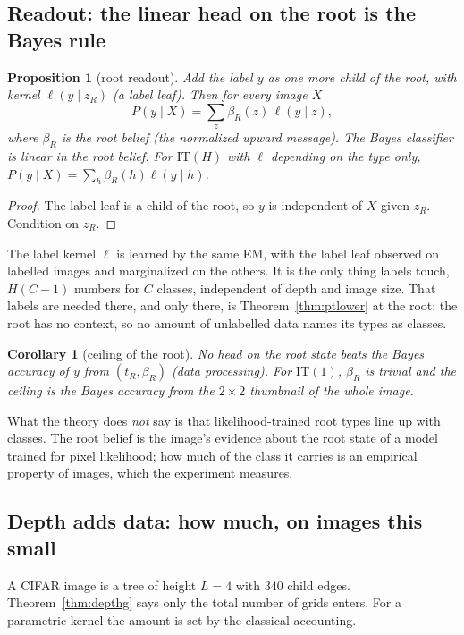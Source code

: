 \documentclass[11pt]{article}
\newtheorem{proposition}[theorem]{Proposition}
\newtheorem{corollary}[theorem]{Corollary}
\theoremstyle{definition}
\begin{document}
\subsection{Readout: the linear head on the root is the Bayes rule}\label{sec:cifar-readout}
\begin{proposition}[root readout]\label{prop:readout}
Add the label $y$ as one more child of the root, with kernel $\ell(y\mid z_R)$ (a \emph{label leaf}). Then for
every image $X$
\[
P(y\mid X)=\sum_{z}\beta_R(z)\,\ell(y\mid z),
\]
where $\beta_R$ is the root belief (the normalized upward message). The Bayes classifier is \emph{linear in the
root belief}. For $\mathrm{IT}(H)$ with $\ell$ depending on the type only, $P(y\mid X)=\sum_h\beta_R(h)\ell(y\mid h)$.
\end{proposition}
\begin{proof}
The label leaf is a child of the root, so $y$ is independent of $X$ given $z_R$. Condition on $z_R$.
\end{proof}

\noindent The label kernel $\ell$ is learned by the same EM, with the label leaf observed on labelled images and
marginalized on the others. It is the only thing labels touch, $H(C-1)$ numbers for $C$ classes, independent of
depth and image size. That labels are needed there, and only there, is Theorem~\ref{thm:ptlower} at the root:
the root has no context, so no amount of unlabelled data names its types as classes.

\begin{corollary}[ceiling of the root]\label{cor:rootceil}
No head on the root state beats the Bayes accuracy of $y$ from $(t_R,\beta_R)$ (data processing). For
$\mathrm{IT}(1)$, $\beta_R$ is trivial and the ceiling is the Bayes accuracy from the $2\times2$ thumbnail of the
whole image.
\end{corollary}

\noindent What the theory does \emph{not} say is that likelihood-trained root types line up with classes. The root
belief is the image's evidence about the root state of a model trained for pixel likelihood; how much of the
class it carries is an empirical property of images, which the experiment measures.

\subsection{Depth adds data: how much, on images this small}\label{sec:cifar-depth}
A CIFAR image is a tree of height $L=4$ with $340$ child edges. Theorem~\ref{thm:depthg} says only the total
number of grids enters. For a parametric kernel the amount is set by the classical accounting.
\end{document}
